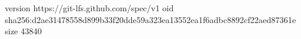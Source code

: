 version https://git-lfs.github.com/spec/v1
oid sha256:d2ae31478558d899b33f20dde59a323ea13552ea1f6adbc8892cf22aed87361e
size 43840
